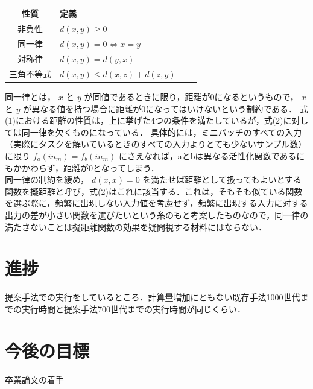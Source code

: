\documentclass[dvipdfmx]{jarticle}
\begin{document}
\begin{tabular}{clcc}
    \hline
    性質  & 定義 \\
    \hline \hline
    非負性 & $d(x, y) \geq 0$ \\
    同一律 & $d(x, y) = 0 \Leftrightarrow x = y$ \\
    対称律 & $d(x, y) = d(y, x)$ \\
    三角不等式 & $d(x, y) \leq d(x, z) + d(z, y)$ \\
    \hline
\end{tabular}

同一律とは， $ x $ と $ y $ が同値であるときに限り，距離が0になるというもので， $ x $ と $ y $ が異なる値を持つ場合に距離が0になってはいけないという制約である．
式(1)における距離の性質は，上に挙げた4つの条件を満たしているが，式(2)に対しては同一律を欠くものになっている．
具体的には，ミニバッチのすべての入力（実際にタスクを解いているときのすべての入力よりとても少ないサンプル数）に限り $ f_{a}(in_{m}) = f_{b}(in_{m}) $ にさえなれば，aとbは異なる活性化関数であるにもかかわらず，距離が0となってしまう．\\
同一律の制約を緩め， $ d(x, x) = 0 $ を満たせば距離として扱ってもよいとする関数を擬距離と呼び，式(2)はこれに該当する．これは，そもそも似ている関数を選ぶ際に，頻繁に出現しない入力値を考慮せず，頻繁に出現する入力に対する出力の差が小さい関数を選びたいという糸のもと考案したものなので，同一律の満たさないことは擬距離関数の効果を疑問視する材料にはならない．

\section{進捗}
提案手法での実行をしているところ．計算量増加にともない既存手法1000世代までの実行時間と提案手法700世代までの実行時間が同じくらい．

\section{今後の目標}
卒業論文の着手
\end{document}
